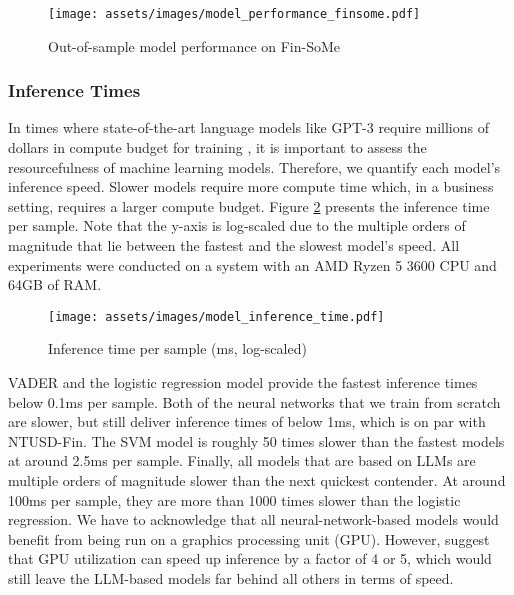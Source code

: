 \begin{figure}[!ht]
	\texttt{[image: assets/images/model\_performance\_finsome.pdf]}	
	\caption{Out-of-sample model performance on Fin-SoMe}
	\label{figure-model-performance-stocktwits}
\end{figure}



\subsubsection{Inference Times}
In times where state-of-the-art language models like GPT-3 require millions of dollars in compute budget for training \cite{gpt3-cost}, it is important to assess the resourcefulness of machine learning models. Therefore, we quantify each model's inference speed. Slower models require more compute time which, in a business setting, requires a larger compute budget. Figure \ref{figure-model-inference-times} presents the inference time per sample. Note that the y-axis is log-scaled due to the multiple orders of magnitude that lie between the fastest and the slowest model's speed. All experiments were conducted on a system with an AMD Ryzen 5 3600 CPU and 64GB of RAM.

\begin{figure}[!ht]
	\texttt{[image: assets/images/model\_inference\_time.pdf]}	
	\caption{Inference time per sample (ms, log-scaled)}
	\label{figure-model-inference-times}
\end{figure}

VADER and the logistic regression model provide the fastest inference times below 0.1ms per sample. Both of the neural networks that we train from scratch are slower, but still deliver inference times of below 1ms, which is on par with NTUSD-Fin. The SVM model is roughly 50 times slower than the fastest models at around 2.5ms per sample. Finally, all models that are based on LLMs are multiple orders of magnitude slower than the next quickest contender. At around 100ms per sample, they are more than 1000 times slower than the logistic regression. We have to acknowledge that all neural-network-based models would benefit from being run on a graphics processing unit (GPU). However,  suggest that GPU utilization can speed up inference by a factor of 4 or 5, which would still leave the LLM-based models far behind all others in terms of speed.

